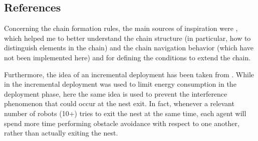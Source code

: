 \begin{center}
\end{center}


\subsection{References}

Concerning the chain formation rules, the main sources of inspiration were \cite{nouyan2004chain}, \cite{nouyan2008path} which helped me to better understand the chain structure (in particular, how to distinguish elements in the chain) and the chain navigation behavior (which have not been implemented here) and \cite{goss1992harvesting} for defining the conditions to extend the chain.

Furthermore, the idea of an incremental deployment has been taken from \cite{stirling2013energy}.
While in \cite{stirling2013energy} the incremental deployment was used to limit energy consumption in the deployment phase, here the same idea is used to prevent the interference phenomenon that could occur at the nest exit.
In fact, whenever a relevant number of robots (10+) tries to exit the nest at the same time, each agent will spend more time performing obstacle avoidance with respect to one another, rather than actually exiting the nest.





